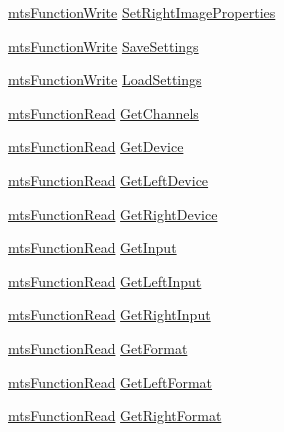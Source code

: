 \begin{DoxyCompactItemize}
\item 
\hyperlink{classmts_function_write}{mts\-Function\-Write} \hyperlink{class_i_req_filter_source_video_capture_a8bc5a60a44fdc2ab5f539ead85190a92}{Set\-Right\-Image\-Properties}
\item 
\hyperlink{classmts_function_write}{mts\-Function\-Write} \hyperlink{class_i_req_filter_source_video_capture_ae85aabe80e1aab1ceed48c8778600726}{Save\-Settings}
\item 
\hyperlink{classmts_function_write}{mts\-Function\-Write} \hyperlink{class_i_req_filter_source_video_capture_ad3519c324883b31f1ea45340b8764adc}{Load\-Settings}
\item 
\hyperlink{classmts_function_read}{mts\-Function\-Read} \hyperlink{class_i_req_filter_source_video_capture_ae3dcbda603dba36a1812e7de73e04c4a}{Get\-Channels}
\item 
\hyperlink{classmts_function_read}{mts\-Function\-Read} \hyperlink{class_i_req_filter_source_video_capture_a1476275d88028dff37eecfd48dc9960e}{Get\-Device}
\item 
\hyperlink{classmts_function_read}{mts\-Function\-Read} \hyperlink{class_i_req_filter_source_video_capture_ac194545c5ce0ebce6caa938325c8f528}{Get\-Left\-Device}
\item 
\hyperlink{classmts_function_read}{mts\-Function\-Read} \hyperlink{class_i_req_filter_source_video_capture_ac2e5f4c6af32e192fef7f7f5c0ac77d6}{Get\-Right\-Device}
\item 
\hyperlink{classmts_function_read}{mts\-Function\-Read} \hyperlink{class_i_req_filter_source_video_capture_aa13ec6756e50314d83f3cc0e1fb34b3b}{Get\-Input}
\item 
\hyperlink{classmts_function_read}{mts\-Function\-Read} \hyperlink{class_i_req_filter_source_video_capture_a853883a36d1b5bb096fe490a8387904e}{Get\-Left\-Input}
\item 
\hyperlink{classmts_function_read}{mts\-Function\-Read} \hyperlink{class_i_req_filter_source_video_capture_ac76226dfeba6131ef09529ee876ebb6b}{Get\-Right\-Input}
\item 
\hyperlink{classmts_function_read}{mts\-Function\-Read} \hyperlink{class_i_req_filter_source_video_capture_a91de3e359f5612e0b37bce18062962dd}{Get\-Format}
\item 
\hyperlink{classmts_function_read}{mts\-Function\-Read} \hyperlink{class_i_req_filter_source_video_capture_ae8b53691a95cdd8d988433bd9fdb8bbe}{Get\-Left\-Format}
\item 
\hyperlink{classmts_function_read}{mts\-Function\-Read} \hyperlink{class_i_req_filter_source_video_capture_a81c7016f009cc1f7092a6e0f3ff6db65}{Get\-Right\-Format}

\end{DoxyCompactItemize}
